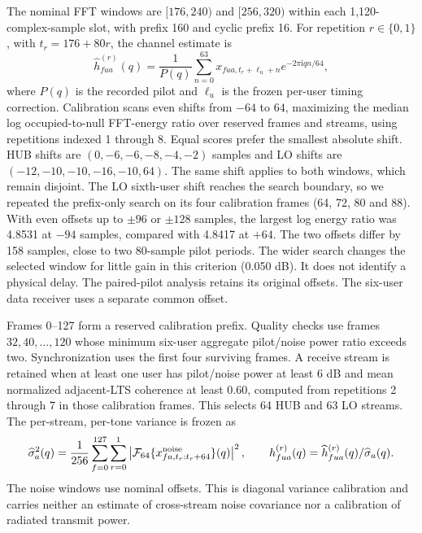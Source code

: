 The nominal FFT windows are $[176,240)$ and $[256,320)$ within each
1,120-complex-sample slot, with prefix 160 and cyclic prefix 16.
For repetition $r\in\{0,1\}$, with $t_r=176+80r$, the channel estimate is
\begin{equation}
 \widehat h^{(r)}_{fua}(q)=\frac{1}{P(q)}
 \sum_{n=0}^{63}x_{fua,t_r+\ell_u+n}e^{-2\pi\mathrm{i}qn/64},
 \label{supp:eq_renew_fft}
\end{equation}
where $P(q)$ is the recorded pilot and $\ell_u$ is the frozen per-user timing
correction. Calibration scans even shifts from $-64$ to $64$, maximizing
the median log occupied-to-null FFT-energy ratio over reserved frames and
streams, using repetitions indexed 1 through 8. Equal scores prefer the
smallest absolute shift. HUB shifts are $(0,-6,-6,-8,-4,-2)$ samples and LO
shifts are $(-12,-10,-10,-16,-10,64)$. The same shift applies to both windows,
which remain disjoint. The LO sixth-user shift reaches the search boundary,
so we repeated the prefix-only search on its four calibration frames (64, 72, 80 and 88). With even offsets up to $\pm96$ or $\pm128$ samples, the largest log energy ratio was 4.8531 at $-94$ samples, compared with 4.8417 at $+64$. The two offsets differ by 158 samples, close to two 80-sample pilot periods. The wider search changes the selected window for little gain in this criterion (0.050 dB). It does not identify a physical delay. The paired-pilot analysis retains its original offsets. The six-user data receiver uses a separate common offset.

Frames 0--127 form a reserved calibration prefix. Quality checks use frames
$32,40,\ldots,120$ whose minimum six-user aggregate pilot/noise power ratio
exceeds two. Synchronization uses the first four surviving frames. A receive
stream is retained when at least one user has pilot/noise power at least
6 dB and mean normalized adjacent-LTS coherence at least 0.60, computed
from repetitions 2 through 7 in those calibration frames. This selects
64 HUB and 63 LO streams. The per-stream, per-tone variance is frozen as
\begin{equation}
 \widehat\sigma_a^2(q)=\frac{1}{256}\sum_{f=0}^{127}\sum_{r=0}^{1}
 \left|\mathcal F_{64}\{x^{\rm noise}_{fa,t_r:t_r+64}\}(q)\right|^2,
 \qquad h^{(r)}_{fua}(q)=\widehat h^{(r)}_{fua}(q)/\widehat\sigma_a(q).
\end{equation}
The noise windows use nominal offsets. This is diagonal variance calibration
and carries neither an estimate of cross-stream noise covariance nor a
calibration of radiated transmit power.

